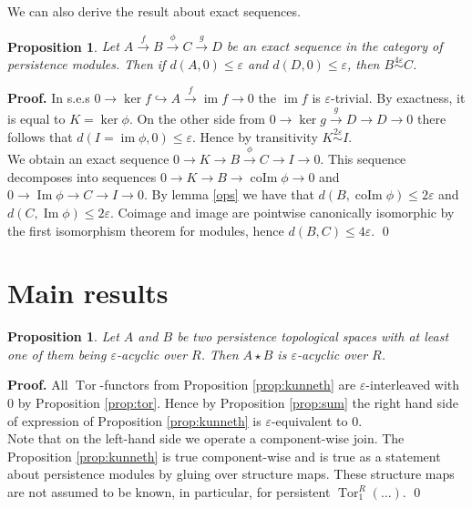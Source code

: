 \documentclass[english,12pt]{article}
\newcounter{stmcounter}[section]
\numberwithin{equation}{section}
\newtheorem{proposition}[stmcounter]{Proposition}
\theoremstyle{definition}
\theoremstyle{remark}
\newenvironment{pf}{\noindent\textbf{Proof.}}{\qed}
\renewcommand{\leq}{\leqslant}
\begin{document}
We can also derive the result about exact sequences.\\

\begin{proposition}
  \label{major}
  Let $A \xrightarrow{f} B \xrightarrow{\phi} C \xrightarrow{g} D$ be an exact sequence in the category of persistence modules. Then if $d(A,0) \leq \varepsilon$ and $d(D,0) \leq \varepsilon$, then $B \stackrel{4\varepsilon}{\sim} C$.
\end{proposition}

\begin{pf}
  In s.e.s $0 \to \ker{f} \hookrightarrow A \xrightarrow{f} \operatorname{im}f \to 0$ the $\operatorname{im}f$ is $\varepsilon$-trivial. By exactness, it is equal to $K = \ker \phi$. On the other side from $0 \to \ker{g} \xrightarrow{g} D \to D \to 0$ there follows that $d(I = \operatorname{im} \phi, 0) \leq \varepsilon$. Hence by transitivity $K \stackrel{2\varepsilon}{\sim} I$.\\

  We obtain an exact sequence $0 \to K \to B \xrightarrow{\phi} C \to I \to 0$. This sequence decomposes into sequences $0 \to K \to B \to \operatorname{coIm}\phi \to 0$ and $0 \to \operatorname{Im}\phi \to C \to I \to 0$. By lemma \ref{ops} we have that $d(B,\operatorname{coIm}\phi) \leq 2\varepsilon$ and $d(C,\operatorname{Im}\phi) \leq 2\varepsilon$. Coimage and image are pointwise canonically isomorphic by the first isomorphism theorem for modules, hence $d(B, C) \leq 4\varepsilon$.
\end{pf}\\

\section{Main results}

\begin{proposition}
  \label{prop:acyclic}
  Let $A$ and $B$ be two persistence topological spaces with at least one of them being $\varepsilon$-acyclic over $R$. Then $A \star B$ is $\varepsilon$-acyclic over $R$.
\end{proposition}

\begin{pf}
  All $\operatorname{Tor}$-functors from Proposition \ref{prop:kunneth} are $\varepsilon$-interleaved with $0$ by Proposition \ref{prop:tor}. Hence by Proposition \ref{prop:sum} the right hand side of expression of Proposition \ref{prop:kunneth} is $\varepsilon$-equivalent to $0$.\\
  
  Note that on the left-hand side we operate a component-wise join. The Proposition \ref{prop:kunneth} is true component-wise and is true as a statement about persistence modules by gluing over structure maps. These structure maps are not assumed to be known, in particular, for persistent $\operatorname{Tor}_1^R(...)$.
\end{pf}\\
\end{document}
